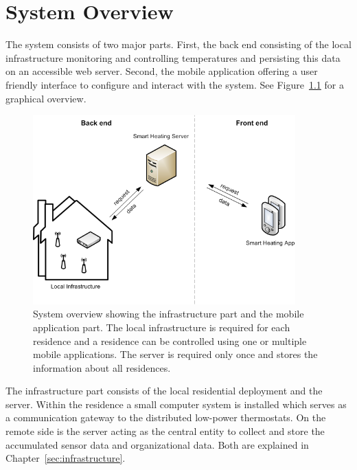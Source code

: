 
\chapter{System Overview}
\label{sec:systemoverview}

The system consists of two major parts.
First, the back end consisting of the local infrastructure monitoring and controlling temperatures and persisting this data on an accessible web server.
Second, the mobile application offering a user friendly interface to configure and interact with the system.
See Figure~\ref{fig:system_overview} for a graphical overview.

\begin{figure}[h]
\begin{center}
\includegraphics[width=0.9\textwidth]{images/SystemOverview.png}
\end{center}
\caption{
	System overview showing the infrastructure part and the mobile application part.
	The local infrastructure is required for each residence and a residence can be controlled using one or multiple mobile applications.
	The server is required only once and stores the information about all residences.
	}
\label{fig:system_overview}
\end{figure}

The infrastructure part consists of the local residential deployment and the server.
Within the residence a small computer system is installed which serves as a communication gateway to the distributed low-power thermostats.
On the remote side is the server acting as the central entity to collect and store the accumulated sensor data and organizational data.
Both are explained in Chapter~\ref{sec:infrastructure}.

